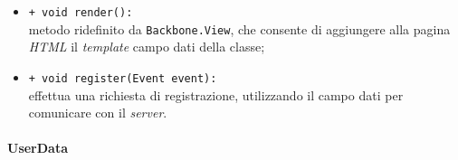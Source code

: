 \begin{flushleft}
\begin{itemize}
\begin{sloppypar}
\begin{itemize}
\item \texttt{+ void render():}\\ metodo ridefinito da \texttt{Backbone.View}, che consente di aggiungere alla pagina \textit{HTML} il \textit{template} campo dati della classe;
\item \texttt{+ void register(Event event):}\\ effettua una richiesta di registrazione, utilizzando il campo dati \model{} per comunicare con il \textit{server}.
\end{itemize}
\end{sloppypar}
\end{itemize}
\end{flushleft}

\paragraph{UserData}
\label{userData}
